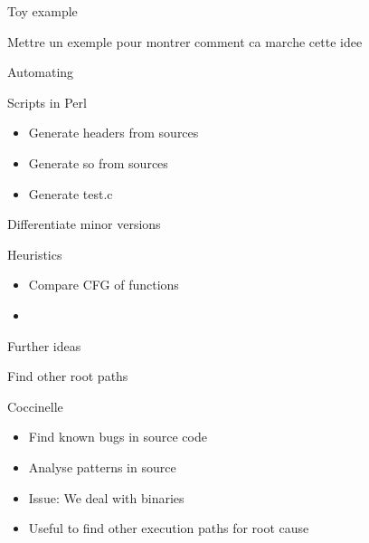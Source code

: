 \documentclass[11pt]{beamer}
\begin{document}
\begin{frame}{Toy example}

Mettre un exemple pour montrer comment ca marche cette idee


\end{frame}

\begin{frame}{Automating}
\begin{block}{Scripts in Perl}
\begin{itemize}
	\item Generate headers from sources
	\item Generate so from sources
	\item Generate test.c
\end{itemize}

\end{block}

\end{frame}



\begin{frame}{Differentiate minor versions}

\begin{block}{Heuristics}
	\begin{itemize}
		\item Compare CFG of functions
		\item 
	\end{itemize}
\end{block}

\end{frame}

\begin{frame}{Further ideas}

\begin{block}


\end{block}

\end{frame}


\begin{frame}{Find other root paths}
\begin{block}{Coccinelle}
	\begin{itemize}
		\item Find known bugs in source code
		\item Analyse patterns in source
		\item Issue: We deal with binaries
		\item Useful to find other execution paths for root cause
	\end{itemize}
\end{block}
\end{frame}
\end{document}
